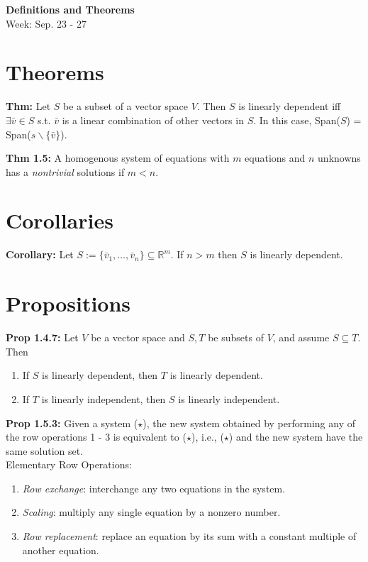 \noindent
\textbf{\LARGE Definitions and Theorems} \\
\Large Week: Sep. 23 - 27

\section{Theorems}

\textbf{Thm:} Let $S$ be a subset of a vector space $V$. Then $S$ is linearly dependent iff $\exists \bar v \in S$ s.t. $\bar v$ is a linear combination of other vectors in $S$. In this case, Span($S$) = Span($s \backslash \{\bar v \}$).

\bigskip

\noindent
\textbf{Thm 1.5:} A homogenous system of equations with $m$ equations and $n$ unknowns has a \textit{nontrivial} solutions if $m < n$.

\section{Corollaries}

\textbf{Corollary:} Let $S := \{\bar v_1, \ldots, \bar v_n \} \subseteq \mathbb{R}^m$. If $n > m$ then $S$ is linearly dependent.

\pagebreak
\section{Propositions}

\textbf{Prop 1.4.7:} Let $V$ be a vector space and $S, T$ be subsets of $V$, and assume $S \subseteq T$. Then 
\begin{enumerate}
    \item If $S$ is linearly dependent, then $T$ is linearly dependent.
    \item If $T$ is linearly independent, then $S$ is linearly independent.
\end{enumerate}

\bigskip

\noindent
\textbf{Prop 1.5.3:} Given a system ($\star$), the new system obtained by performing any of the row operations 1 - 3 is equivalent to ($\star$), i.e., ($\star$) and the new system have the same solution set. \\
Elementary Row Operations:
\begin{enumerate}
    \item \textit{Row exchange}: interchange any two equations in the system.
    \item \textit{Scaling}: multiply any single equation by a nonzero number.
    \item \textit{Row replacement}: replace an equation by its sum with a constant multiple of another equation.
\end{enumerate}


